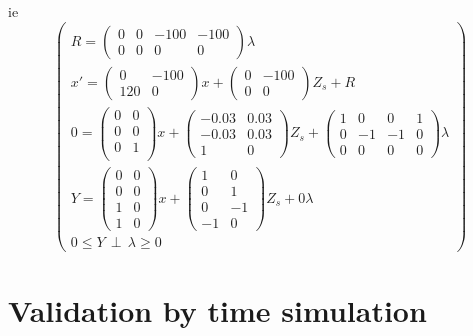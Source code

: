 ie
\[
\left(\begin{array}{c}
R=\left(\begin{array}{cccc}
0&0&-100&-100\\
0&0&0&0\end{array} \right) \lambda\\
  
x'=\left(\begin{array}{cc}
0 &-100\\
120&0\end{array} \right)x
+\left(\begin{array}{cc}
0&-100\\
0&0\end{array} \right)Z_{s}+R\\
0=\left(\begin{array}{cc}
0 &0\\
0 &0\\
0 &1\\\end{array} \right)x
+\left(\begin{array}{cc}
-0.03&0.03\\
-0.03&0.03\\
1&0\end{array} \right)Z_{s}
+\left(\begin{array}{cccc}
1&0&0&1\\
0&-1&-1&0\\
0&0&0&0\end{array} \right)\lambda\\
Y=\left(\begin{array}{cc}
0&0\\
0&0\\
1&0\\
1&0\end{array}\right) x+
\left(\begin{array}{cc}
1&0\\
0&1\\
0&-1\\
-1&0\end{array}
\right) Z_{s} +0\lambda\\

0 \leq Y \, \perp \, \lambda \geq 0

\end{array}
\right)
\]


\section{Validation by time simulation}

